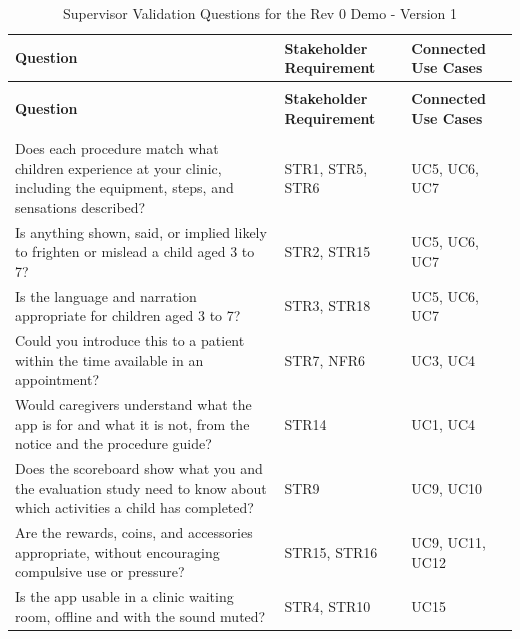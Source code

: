 \documentclass[10pt,titlepage]{article}
\begin{document}
\begin{longtable}{@{}>{\raggedright\arraybackslash}p{} >{\raggedright\arraybackslash}p{} >{\raggedright\arraybackslash}p{}@{}}
\caption{Supervisor Validation Questions for the Rev 0 Demo - Version 1}
\label{tab:ValidationQuestionsTable}\\

\toprule
\textbf{Question} & \textbf{Stakeholder Requirement} & \textbf{Connected Use Cases} \\
\midrule
\endfirsthead

\multicolumn{3}{c}{\tablename\ \thetable{} -- continued from previous page} \\
\toprule
\textbf{Question} & \textbf{Stakeholder Requirement} & \textbf{Connected Use Cases} \\
\midrule
\endhead

\midrule
\multicolumn{3}{r}{Continued on next page} \\
\endfoot

\bottomrule
\endlastfoot

Does each procedure match what children experience at your clinic, including the equipment, steps, and sensations described?
& STR1, STR5, STR6
& UC5, UC6, UC7 \\

Is anything shown, said, or implied likely to frighten or mislead a child aged 3 to 7?
& STR2, STR15
& UC5, UC6, UC7 \\

Is the language and narration appropriate for children aged 3 to 7?
& STR3, STR18
& UC5, UC6, UC7 \\

Could you introduce this to a patient within the time available in an appointment?
& STR7, NFR6
& UC3, UC4 \\

Would caregivers understand what the app is for and what it is not, from the notice and the procedure guide?
& STR14
& UC1, UC4 \\

Does the scoreboard show what you and the evaluation study need to know about which activities a child has completed?
& STR9
& UC9, UC10 \\

Are the rewards, coins, and accessories appropriate, without encouraging compulsive use or pressure?
& STR15, STR16
& UC9, UC11, UC12 \\

Is the app usable in a clinic waiting room, offline and with the sound muted?
& STR4, STR10
& UC15 \\

\end{longtable}
\end{document}
